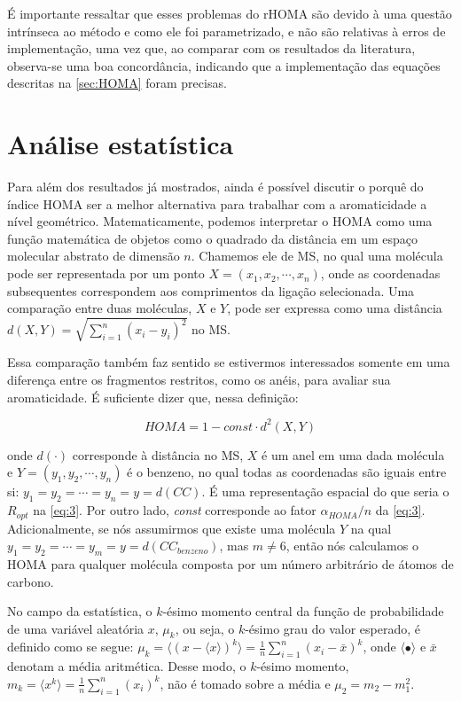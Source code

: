 \noindent É importante ressaltar que esses problemas do \gls{rHOMA} são devido à uma questão intrínseca ao método e como ele foi parametrizado, e não são relativas à erros de implementação, uma vez que, ao comparar com os resultados da literatura, observa-se uma boa concordância, indicando que a implementação das equações descritas na \autoref{sec:HOMA} foram precisas.

\section{Análise estatística}

Para além dos resultados já mostrados, ainda é possível discutir o porquê do índice \gls{HOMA} ser a melhor alternativa para trabalhar com a aromaticidade a nível geométrico. Matematicamente, podemos interpretar o \gls{HOMA} como uma função matemática de objetos como o quadrado da distância em um espaço molecular abstrato de dimensão $n$. Chamemos ele de \gls{MS}, no qual uma molécula pode ser representada por um ponto $X = (x_1, x_2, \cdots, x_n)$, onde as coordenadas subsequentes correspondem aos comprimentos da ligação  selecionada. Uma comparação entre duas moléculas, $X$ e $Y$, pode ser expressa como uma distância $d(X, Y) = \displaystyle \sqrt{\sum_{i=1}^{n} (x_i - y_i)^2}$ no \gls{MS}. 

Essa comparação também faz sentido se estivermos interessados somente em uma diferença entre os fragmentos restritos, como os anéis, para avaliar sua aromaticidade. É suficiente dizer que, nessa definição:

\begin{equation}
    HOMA = 1 - \textit{const} \cdot d^2(X, Y)
\end{equation}

\noindent onde $d(\cdot)$ corresponde à distância no \gls{MS}, $X$ é um anel em uma dada molécula e $Y = (y_1, y_2, \cdots, y_n)$ é o benzeno, no qual todas as coordenadas são iguais entre si: $y_1 = y_2 = \cdots = y_n = y = d(CC)$. É uma representação espacial do que seria o $R_{opt}$ na \autoref{eq:3}. Por outro lado, \textit{const} corresponde ao fator $\alpha_{HOMA} / n$ da \autoref{eq:3}. Adicionalmente, se nós assumirmos que existe uma molécula $Y$ na qual $y_1 = y_2 = \cdots = y_m = y = d(CC_{benzeno})$, mas $m \neq 6$, então nós calculamos o \gls{HOMA} para qualquer molécula composta por um número arbitrário de átomos de carbono.

No campo da estatística, o $k$-ésimo momento central da função de probabilidade de uma variável aleatória $x$, $\mu_k$, ou seja, o $k$-ésimo grau do valor esperado, é definido como se segue: $\mu_k = \langle (x - \langle x \rangle)^k \rangle = \displaystyle \frac{1}{n} \sum_{i = 1}^n (x_i - \bar{x})^k$, onde $\langle \bullet \rangle$ e $\bar{x}$ denotam a média aritmética.
Desse modo, o $k$-ésimo momento, $m_k = \langle x^k \rangle = \displaystyle \frac{1}{n} \sum_{i=1}^n (x_i)^k$, não é tomado sobre a média e $\mu_2 = m_2 - m_1^2$.

